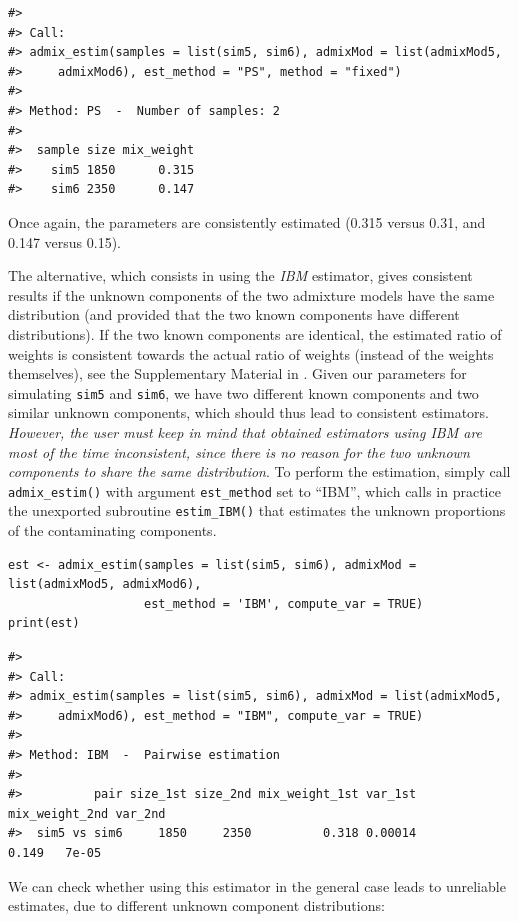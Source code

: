 \begin{verbatim}
#> 
#> Call:
#> admix_estim(samples = list(sim5, sim6), admixMod = list(admixMod5, 
#>     admixMod6), est_method = "PS", method = "fixed")
#> 
#> Method: PS  -  Number of samples: 2 
#> 
#>  sample size mix_weight
#>    sim5 1850      0.315
#>    sim6 2350      0.147
\end{verbatim}

Once again, the parameters are consistently estimated (0.315 versus 0.31, and 0.147 versus 0.15).

The alternative, which consists in using the \emph{IBM} estimator, gives consistent results if the unknown components of the two admixture models have the same distribution (and provided that the two known components have different distributions). If the two known components are identical, the estimated ratio of weights is consistent towards the actual ratio of weights (instead of the weights themselves), see the Supplementary Material in \citet{Milhaud+Pommeret+Salhi+Vandekerkhove:2023}. Given our parameters for simulating \texttt{sim5} and \texttt{sim6}, we have two different known components and two similar unknown components, which should thus lead to consistent estimators. \emph{However, the user must keep in mind that obtained estimators using IBM are most of the time inconsistent, since there is no reason for the two unknown components to share the same distribution}. To perform the estimation, simply call \texttt{admix\_estim()} with argument \texttt{est\_method} set to ``IBM'', which calls in practice the unexported subroutine \texttt{estim\_IBM()} that estimates the unknown proportions of the contaminating components.

\begin{verbatim}
est <- admix_estim(samples = list(sim5, sim6), admixMod = list(admixMod5, admixMod6),
                   est_method = 'IBM', compute_var = TRUE)
print(est)
\end{verbatim}

\begin{verbatim}
#> 
#> Call:
#> admix_estim(samples = list(sim5, sim6), admixMod = list(admixMod5, 
#>     admixMod6), est_method = "IBM", compute_var = TRUE)
#> 
#> Method: IBM  -  Pairwise estimation
#> 
#>          pair size_1st size_2nd mix_weight_1st var_1st mix_weight_2nd var_2nd
#>  sim5 vs sim6     1850     2350          0.318 0.00014          0.149   7e-05
\end{verbatim}

We can check whether using this estimator in the general case leads to unreliable estimates, due to different unknown component distributions:

